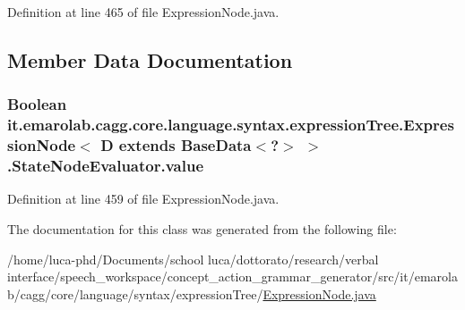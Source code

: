 Definition at line 465 of file Expression\-Node.\-java.



\subsection{Member Data Documentation}
\hypertarget{classit_1_1emarolab_1_1cagg_1_1core_1_1language_1_1syntax_1_1expressionTree_1_1ExpressionNode_3_98df205ce8da64f1ea3f26a27a596721_a07d5958571f48ae0dd940f5d675e8bdf}{
\subsubsection[{value}]{\setlength{\rightskip}{0pt plus 5cm}Boolean it.\-emarolab.\-cagg.\-core.\-language.\-syntax.\-expression\-Tree.\-Expression\-Node$<$ D extends Base\-Data$<$?$>$ $>$.State\-Node\-Evaluator.\-value\hspace{0.3cm}{\ttfamily [private]}}}\label{classit_1_1emarolab_1_1cagg_1_1core_1_1language_1_1syntax_1_1expressionTree_1_1ExpressionNode_3_98df205ce8da64f1ea3f26a27a596721_a07d5958571f48ae0dd940f5d675e8bdf}


Definition at line 459 of file Expression\-Node.\-java.



The documentation for this class was generated from the following file\-:\begin{DoxyCompactItemize}
\item 
/home/luca-\/phd/\-Documents/school luca/dottorato/research/verbal interface/speech\-\_\-workspace/concept\-\_\-action\-\_\-grammar\-\_\-generator/src/it/emarolab/cagg/core/language/syntax/expression\-Tree/\hyperlink{ExpressionNode_8java}{Expression\-Node.\-java}\end{DoxyCompactItemize}
